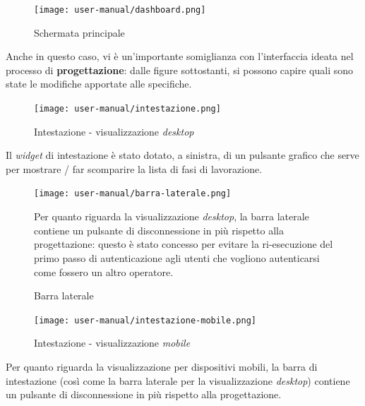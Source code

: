 \begin{figure}[H]
  \centering
  \texttt{[image: user-manual/dashboard.png]}
  \caption{Schermata principale}
\end{figure}
Anche in questo caso, vi è un'importante somiglianza con l'interfaccia ideata nel processo di \textbf{progettazione}: dalle figure sottostanti, si possono capire quali sono state le modifiche apportate alle specifiche.

\begin{figure}[H]
  \centering
  \texttt{[image: user-manual/intestazione.png]}
  \caption{Intestazione - visualizzazione \textit{desktop}}
\end{figure}
Il \textit{widget} di intestazione è stato dotato, a sinistra, di un pulsante grafico che serve per mostrare / far scomparire la lista di fasi di lavorazione.

\begin{figure}[H]
  \begin{minipage}{0.3\textwidth}
    \texttt{[image: user-manual/barra-laterale.png]}
    \caption{Barra laterale}
  \end{minipage}%
  \begin{minipage}{0.7\textwidth}
    Per quanto riguarda la visualizzazione \textit{desktop}, la barra laterale contiene un pulsante di disconnessione in più rispetto alla progettazione: questo è stato concesso per evitare la ri-esecuzione del primo passo di autenticazione agli utenti che vogliono autenticarsi come fossero un altro operatore.
  \end{minipage}
  
\end{figure}

\begin{figure}[H]
  \centering
  \texttt{[image: user-manual/intestazione-mobile.png]}
  \caption{Intestazione - visualizzazione \textit{mobile}}
\end{figure}
Per quanto riguarda la visualizzazione per dispositivi mobili, la barra di intestazione (così come la barra laterale per la visualizzazione \textit{desktop}) contiene un pulsante di disconnessione in più rispetto alla progettazione.